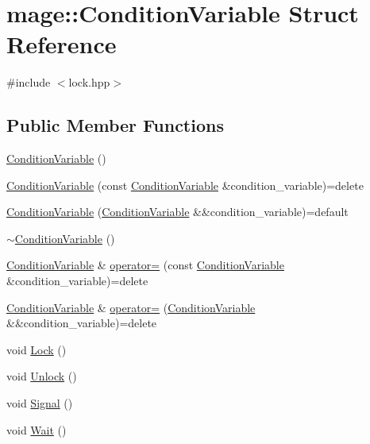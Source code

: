 \hypertarget{structmage_1_1_condition_variable}{}\section{mage\+:\+:Condition\+Variable Struct Reference}
\label{structmage_1_1_condition_variable}


{\ttfamily \#include $<$lock.\+hpp$>$}

\subsection*{Public Member Functions}
\begin{DoxyCompactItemize}
\item 
\hyperlink{structmage_1_1_condition_variable_a09073f0affc601f052fce541a17ba559}{Condition\+Variable} ()
\item 
\hyperlink{structmage_1_1_condition_variable_add5ccf5807a94588c28621141df334d3}{Condition\+Variable} (const \hyperlink{structmage_1_1_condition_variable}{Condition\+Variable} \&condition\+\_\+variable)=delete
\item 
\hyperlink{structmage_1_1_condition_variable_a16507f71180938eb82af7e35d3ca5df7}{Condition\+Variable} (\hyperlink{structmage_1_1_condition_variable}{Condition\+Variable} \&\&condition\+\_\+variable)=default
\item 
\hyperlink{structmage_1_1_condition_variable_accd5253beb65b2904428afdb889cf00b}{$\sim$\+Condition\+Variable} ()
\item 
\hyperlink{structmage_1_1_condition_variable}{Condition\+Variable} \& \hyperlink{structmage_1_1_condition_variable_ac83eae5353cd004ee06fe2376e5bdbf4}{operator=} (const \hyperlink{structmage_1_1_condition_variable}{Condition\+Variable} \&condition\+\_\+variable)=delete
\item 
\hyperlink{structmage_1_1_condition_variable}{Condition\+Variable} \& \hyperlink{structmage_1_1_condition_variable_a3f05c5b53b2530e9fdd1bb890aa375c4}{operator=} (\hyperlink{structmage_1_1_condition_variable}{Condition\+Variable} \&\&condition\+\_\+variable)=delete
\item 
void \hyperlink{structmage_1_1_condition_variable_acb0fa4a842b6979ac35c70dab0f43813}{Lock} ()
\item 
void \hyperlink{structmage_1_1_condition_variable_a3b3fe63417b7d7adedc9fe015fc7feea}{Unlock} ()
\item 
void \hyperlink{structmage_1_1_condition_variable_a09e52f0d51c10ee565a895d2444175d9}{Signal} ()
\item 
void \hyperlink{structmage_1_1_condition_variable_abc279c54285145d981f409c2d110c85a}{Wait} ()
\end{DoxyCompactItemize}
